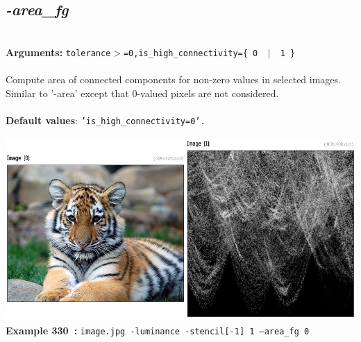 \documentclass[a4paper,11pt,twoside]{book}
\begin{document}
\subsection{\emph{-area\_fg} }\vspace*{-0.5em}
~\\\textbf{Arguments: } 
{\small \texttt{tolerance$>$=0,is\_high\_connectivity=\{ 0 ~$|$~ 1 \}}}\\~\\
Compute area of connected components for non-zero values in selected images.
~\\Similar to '-area' except that 0-valued pixels are not considered.
~\\~\\\textbf{Default values}: {\small \texttt{'is\_high\_connectivity=0'.}}
\begin{center}\includegraphics[keepaspectratio=true,height=7cm,width=\textwidth]{img/gmic_def330.jpg}\\
{\footnotesize \textbf{Example 330~:} \texttt{image.jpg -luminance -stencil[-1] 1 --area\_fg 0}}
\end{center}
\end{document}
